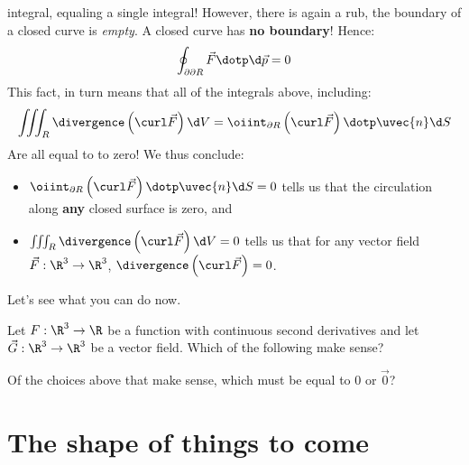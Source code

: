 \documentclass{ximera}
\begin{document}
integral, equaling a single integral! However, there is again a rub,
the boundary of a closed curve is \textit{empty}. A closed curve has
\textbf{no boundary}! Hence:
\[
\oint_{\partial\partial R} \vec{F}\dotp \d \vec{p} = 0
\]
This fact, in turn means that all of the integrals above, including:
\[
\iiint_R \divergence\left(\curl\vec{F}\right)\d V = \oiint_{\partial R} \left(\curl \vec{F}\right)\dotp \uvec{n} \d S
\]
Are all equal to to zero!  We thus conclude:
\begin{itemize}
\item $\oiint_{\partial R} \left(\curl \vec{F}\right)\dotp \uvec{n} \d
  S=0$ tells us that the circulation along \textbf{any} closed surface
  is zero, and
\item $\iiint_R \divergence\left(\curl\vec{F}\right)\d V = 0$ tells us
  that for any vector field $\vec{F}:\R^3\to\R^3$,
  $\divergence\left(\curl\vec{F}\right)=0$.
\end{itemize}

Let's see what you can do now.


\begin{question}
  Let $F:\R^3\to \R$ be a function with continuous second derivatives
  and let $\vec{G}:\R^3\to\R^3$ be a vector field. Which of the
  following make sense?
  \begin{selectAll}
  \end{selectAll}
  \begin{question}
    Of the choices above that make sense, which must be equal to $0$
    or $\vec{0}$?
    \begin{prompt}
      \begin{selectAll}
    \end{selectAll}
    \end{prompt}
    \end{question}
\end{question}



\section{The shape of things to come}
\end{document}
